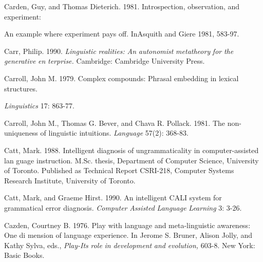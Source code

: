\begin{styleStandard}
Carden, Guy, and Thomas Dieterich. 1981. Introspection, observation, and experiment:
\end{styleStandard}


\begin{styleStandard}
An example where experiment pays off. InAsquith and Giere 1981, 583-97.
\end{styleStandard}


\begin{styleStandard}
Carr, Philip. 1990. \textit{Linguistic}\textit{ }\textit{realities:}\textit{ }\textit{An}\textit{ }\textit{autonomist}\textit{ }\textit{metatheory}\textit{ }\textit{for}\textit{ }\textit{the}\textit{ }\textit{generative}\textit{ }\textit{en\-}\textit{ }\textit{terprise.}\textit{ }Cambridge: Cambridge University Press.
\end{styleStandard}


\begin{styleStandard}
Carroll, John M. 1979. Complex compounds: Phrasal embedding in lexical structures.
\end{styleStandard}


\begin{styleStandard}
\textit{Linguistics}\textit{ }17: 863-77.
\end{styleStandard}


\begin{styleStandard}
Carroll, John M., Thomas G. Bever, and Chava R. Pollack. 1981. The non-uniqueness of linguistic intuitions. \textit{Language}\textit{ }57(2): 368-83.
\end{styleStandard}


\begin{styleStandard}
Catt, Mark. 1988. Intelligent diagnosis of ungrammaticality in computer-assisted lan\- guage instruction. M.Sc. thesis, Department of Computer Science, University of Toronto. Published as Technical Report CSRI-218, Computer Systems Research Institute, University of Toronto.
\end{styleStandard}


\begin{styleStandard}
Catt, Mark, and Graeme Hirst. 1990. An intelligent CALI system for grammatical error diagnosis. \textit{Computer}\textit{ }\textit{Assisted}\textit{ }\textit{Language}\textit{ }\textit{Learning}\textit{ }3: 3-26.
\end{styleStandard}


\begin{styleStandard}
Cazden, Courtney B. 1976. Play with language and meta-linguistic awareness: One di\- mension of language experience. In Jerome S. Bruner, Alison Jolly, and Kathy Sylva, eds., \textit{Play-}\textit{Its}\textit{ }\textit{role}\textit{ }\textit{in}\textit{ }\textit{development}\textit{ }\textit{and}\textit{ }\textit{evolution,}\textit{ }603-8. New York: Basic Books.
\end{styleStandard}


